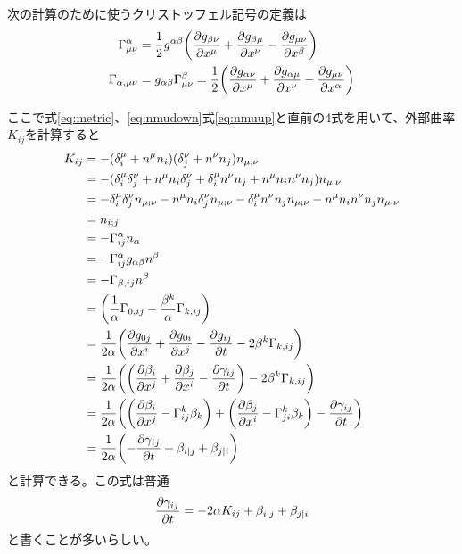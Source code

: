 \documentclass[autodetect-engine,dvi=dvipdfmx,ja=standard, 10pt, a4paper]{bxjsarticle}
\begin{document}
次の計算のために使うクリストッフェル記号の定義は
\begin{align}
	\Gamma^\alpha_{\mu\nu} &= \frac{1}{2}g^{\alpha\beta}\qty(\pdv{g_{\beta\nu}}{x^\mu} + \pdv{g_{\beta\mu}}{x^\nu} - \pdv{g_{\mu\nu}}{x^\beta})\\
	\Gamma_{\alpha,\mu\nu} &= g_{\alpha\beta}\Gamma^\beta_{\mu\nu} = \frac{1}{2}\qty(\pdv{g_{\alpha\nu}}{x^\mu} + \pdv{g_{\alpha\mu}}{x^\nu} - \pdv{g_{\mu\nu}}{x^\alpha})
\end{align}

ここで式\eqref{eq:metric}、\eqref{eq:nmudown}式\eqref{eq:nmuup}と直前の4式を用いて、外部曲率$K_{ij}$を計算すると
\begin{align}
	K_{ij} &= -(\delta_i^\mu + n^\mu n_i)(\delta_j^\nu + n^\nu n_j)n_{\mu;\nu}\nonumber\\
	&= -(\delta_i^\mu \delta_j^\nu + n^\mu n_i \delta_j^\nu + \delta_i^\mu n^\nu n_j + n^\mu n_i n^\nu n_j)n_{\mu;\nu}\nonumber\\
	&= -\delta_i^\mu \delta_j^\nu n_{\mu;\nu} - n^\mu n_i \delta_j^\nu n_{\mu;\nu} - \delta_i^\mu n^\nu n_j n_{\mu;\nu} - n^\mu n_i n^\nu n_j n_{\mu;\nu}\nonumber\\
	&= n_{i;j}\nonumber\\
	&= -\Gamma^\alpha_{ij}n_\alpha\nonumber\\
	&= -\Gamma^\alpha_{ij}g_{\alpha\beta}n^\beta\nonumber\\
	&= -\Gamma_{\beta,ij}n^\beta\nonumber\\
	&= \qty(\frac{1}{\alpha}\Gamma_{0,ij} - \frac{\beta^k}{\alpha}\Gamma_{k,ij})\nonumber\\
	&= \frac{1}{2\alpha}\qty( \pdv{g_{0j}}{x^i} + \pdv{g_{0i}}{x^j} - \pdv{g_{ij}}{t} - 2\beta^k \Gamma_{k,ij} )\nonumber\\
	&= \frac{1}{2\alpha}\qty( \qty(\pdv{\beta_i}{x^j} + \pdv{\beta_j}{x^i} - \pdv{\gamma_{ij}}{t}) - 2\beta^k \Gamma_{k,ij} )\nonumber\\
	&= \frac{1}{2\alpha}\qty( \qty(\pdv{\beta_i}{x^j} - \Gamma^k_{ij}\beta_k) + \qty(\pdv{\beta_j}{x^i} - \Gamma^k_{ji}\beta_k) - \pdv{\gamma_{ij}}{t} )\nonumber\\
	&= \frac{1}{2\alpha}\qty(-\pdv{\gamma_{ij}}{t} + \beta_{i|j} + \beta_{j|i})
\end{align}
と計算できる。この式は普通
\begin{align}
	\pdv{\gamma_{ij}}{t} = -2\alpha K_{ij} + \beta_{i|j} + \beta_{j|i}\label{eq:gamma_evolution}
\end{align}
と書くことが多いらしい。
\end{document}
